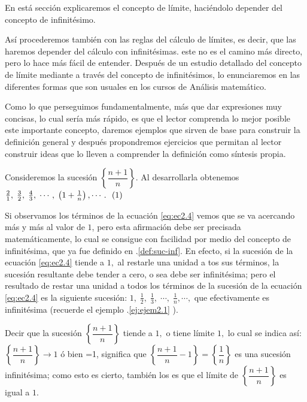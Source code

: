 \documentclass[oneside,english,spanish,2m,twoside,svgnames,x11names,HTML,twoside,12pt]{libro-matua}\usepackage[]{graphicx}\usepackage[]{color}
\def\myref#1{\textcolor{ptctitle}{\thesection .\ref{#1}}}
\newcommand{\inline}{\refstepcounter{equation}~~\mbox{(\theequation)}}%
\begin{document}
\intro

En está sección explicaremos el concepto de límite, haciéndolo depender
del concepto de infinitésimo.

Así procederemos también con las reglas del cálculo de límites, es
decir, que las haremos depender del cálculo con infinitésimas. este
no es el camino más directo, pero lo hace más fácil de entender. Después
de un estudio detallado del concepto de límite mediante a través del
concepto de infinitésimos, lo enunciaremos en las diferentes formas
que son usuales en los cursos de Análisis matemático.

Como lo que perseguimos fundamentalmente, más que dar expresiones
muy concisas, lo cual sería más rápido, es que el lector comprenda
lo mejor posible este importante concepto, daremos ejemplos que sirven
de base para construir la definición general y después propondremos
ejercicios que permitan al lector construir ideas que lo lleven a
comprender la definición como síntesis propia. 

\begin{ejemplo}\label{ej:ejem2.3}

Consideremos la sucesión $\left\{ \dfrac{n+1}{n}\right\} .$ Al desarrollarla
obtenemos $\frac{2}{1},\;\frac{3}{2},\;\frac{4}{3},\;\cdots,\;\left(1+\frac{1}{n}\right),\cdots.\inline\text{\label{eq:ec2.4}}$ 

Si observamos los términos de la ecuación \ref{eq:ec2.4} vemos que
se va acercando más y más al valor de $1$, pero esta afirmación debe
ser precisada matemáticamente, lo cual se consigue con facilidad por
medio del concepto de infinitésima, que ya fue definido en \myref{def:suc-inf}.
En efecto, si la sucesión de la ecuación \ref{eq:ec2.4} tiende a
$1,$ al restarle una unidad a tos sus términos, la sucesión resultante
debe tender a cero, o sea debe ser infinitésima; pero el resultado
de restar una unidad a todos los términos de la sucesión de la ecuación
\ref{eq:ec2.4} es la siguiente sucesión: $1,\;\frac{1}{2},\;\frac{1}{3},\;\cdots,\;\frac{1}{n},\cdots,$
que efectivamente es infinitésima (recuerde el ejemplo \myref{ej:ejem2.1}
). 

\end{ejemplo}

\resu Decir que la sucesión $\left\{ \dfrac{n+1}{n}\right\} $ tiende
a $1,$ o tiene límite $1,$ lo cual se indica así: $\left\{ \dfrac{n+1}{n}\right\} \rightarrow1$
ó bien =1,  significa que $\left\{ \dfrac{n+1}{n}-1\right\} =\left\{ \dfrac{1}{n}\right\} $
es una sucesión infinitésima; como esto es cierto, también los es
que el límite de $\left\{ \dfrac{n+1}{n}\right\} $ es igual a $1.$
\end{document}
